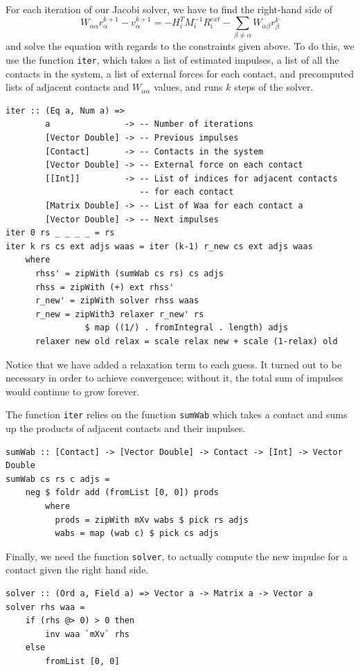 \documentclass[runningheads,a4paper]{llncs}
\begin{document}
For each iteration of our Jacobi solver, we have to find the right-hand side of
\begin{equation} \label{lhs=rhs}
  W_{\alpha\alpha} r_\alpha^{k+1} - v_\alpha^{k+1}= - H_i^T M_i^{-1} R_i^{ext}
  - \sum\limits_{\beta \neq \alpha} W_{\alpha\beta} r_\beta^k
\end{equation}
and solve the equation with regards to the constraints given above. To do this,
we use the function \verb+iter+, which takes a list of estimated impulses, a
list of all the contacts in the system, a list of external forces for each
contact, and precomputed lists of adjacent contacts and $W_{\alpha\alpha}$
values, and runs $k$ steps of the solver.

\begin{verbatim}
iter :: (Eq a, Num a) =>
        a               -> -- Number of iterations
        [Vector Double] -> -- Previous impulses
        [Contact]       -> -- Contacts in the system
        [Vector Double] -> -- External force on each contact
        [[Int]]         -> -- List of indices for adjacent contacts
                           -- for each contact
        [Matrix Double] -> -- List of Waa for each contact a
        [Vector Double] -> -- Next impulses
iter 0 rs _ _ _ _ = rs
iter k rs cs ext adjs waas = iter (k-1) r_new cs ext adjs waas
    where
      rhss' = zipWith (sumWab cs rs) cs adjs
      rhss = zipWith (+) ext rhss'
      r_new' = zipWith solver rhss waas
      r_new = zipWith3 relaxer r_new' rs
                $ map ((1/) . fromIntegral . length) adjs
      relaxer new old relax = scale relax new + scale (1-relax) old
\end{verbatim}
Notice that we have added a relaxation term to each guess. It turned out to be
necessary in order to achieve convergence; without it, the total sum of
impulses would continue to grow forever.

The function \verb+iter+ relies on the function \verb+sumWab+ which takes a
contact and sums up the products of adjacent contacts and their impulses.
\begin{verbatim}
sumWab :: [Contact] -> [Vector Double] -> Contact -> [Int] -> Vector Double
sumWab cs rs c adjs =
    neg $ foldr add (fromList [0, 0]) prods
        where
          prods = zipWith mXv wabs $ pick rs adjs
          wabs = map (wab c) $ pick cs adjs
\end{verbatim}

Finally, we need the function \verb+solver+, to actually compute the new
impulse for a contact given the right hand side.
\begin{verbatim}
solver :: (Ord a, Field a) => Vector a -> Matrix a -> Vector a
solver rhs waa =
    if (rhs @> 0) > 0 then
        inv waa `mXv` rhs
    else
        fromList [0, 0]
\end{verbatim}
\end{document}
